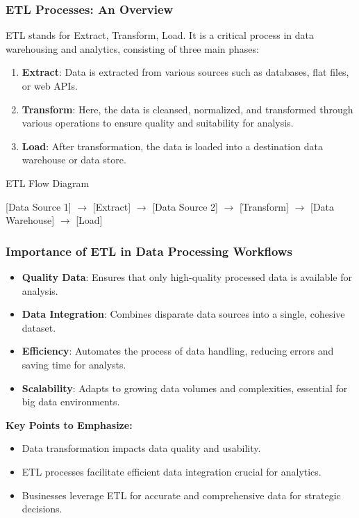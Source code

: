 \documentclass[aspectratio=169]{beamer}
\begin{document}
\begin{frame}[fragile]
    \frametitle{ETL Processes: An Overview}
    ETL stands for Extract, Transform, Load. It is a critical process in data warehousing and analytics, consisting of three main phases:

    \begin{enumerate}
        \item \textbf{Extract}: Data is extracted from various sources such as databases, flat files, or web APIs.
        \item \textbf{Transform}: Here, the data is cleansed, normalized, and transformed through various operations to ensure quality and suitability for analysis.
        \item \textbf{Load}: After transformation, the data is loaded into a destination data warehouse or data store.
    \end{enumerate}
    
    \begin{block}{ETL Flow Diagram}
    \begin{center}
    [Data Source 1] $\rightarrow$ [Extract] $\rightarrow$ [Data Source 2] $\rightarrow$ [Transform] $\rightarrow$ [Data Warehouse] $\rightarrow$ [Load]
    \end{center}
    \end{block}
\end{frame}

\begin{frame}[fragile]
    \frametitle{Importance of ETL in Data Processing Workflows}
    \begin{itemize}
        \item \textbf{Quality Data}: Ensures that only high-quality processed data is available for analysis.
        \item \textbf{Data Integration}: Combines disparate data sources into a single, cohesive dataset.
        \item \textbf{Efficiency}: Automates the process of data handling, reducing errors and saving time for analysts.
        \item \textbf{Scalability}: Adapts to growing data volumes and complexities, essential for big data environments.
    \end{itemize}
    
    \textbf{Key Points to Emphasize:}
    \begin{itemize}
        \item Data transformation impacts data quality and usability.
        \item ETL processes facilitate efficient data integration crucial for analytics.
        \item Businesses leverage ETL for accurate and comprehensive data for strategic decisions.
    \end{itemize}
\end{frame}
\end{document}
